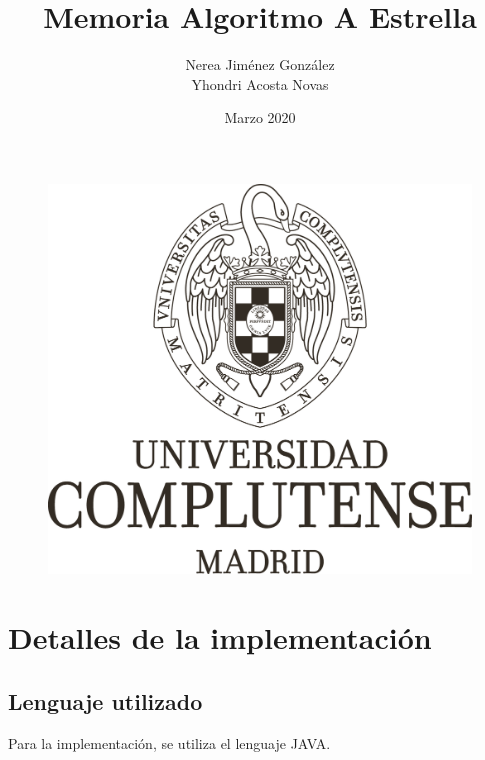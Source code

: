 \documentclass[12pt]{article}
\title{Memoria Algoritmo A Estrella}
\author{Nerea Jiménez González\\ Yhondri Acosta Novas}
\date{Marzo 2020}
\begin{document}
\maketitle
\begin{figure}[H]
    \centering
    \includegraphics[width=1\textwidth]{3-2016-07-21-Marca UCM Monocromo Negro.png}
\end{figure}

\newpage
\tableofcontents
\newpage

\section{Detalles de la implementación}
\subsection{Lenguaje utilizado}
Para la implementación, se utiliza el lenguaje JAVA.
\end{document}
